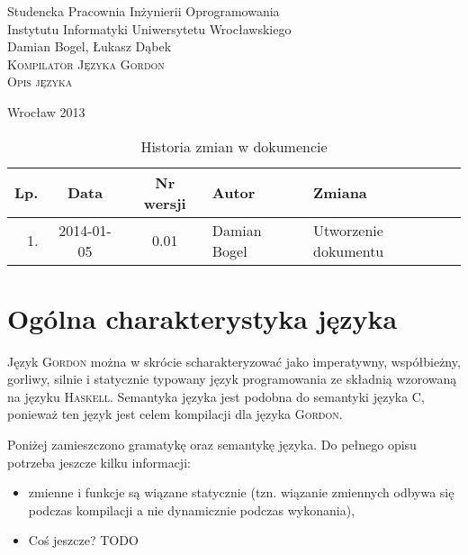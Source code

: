\documentclass{documentation}
\begin{document}
\begin{titlepage}
\begin{center}
Studencka Pracownia Inżynierii Oprogramowania\\
Instytutu Informatyki Uniwersytetu Wrocławskiego\\[6cm]

Damian Bogel, Łukasz Dąbek\\[1cm]
\textsc{\LARGE Kompilator Języka Gordon}\\[0.5cm]
\textsc{\large Opis języka}

\vfill
Wrocław 2013 \\[2.5cm]

\end{center}
\end{titlepage}

\newpage
\begin{table}
	\centering
    \captionsetup{name=Tabela}
	\caption{Historia zmian w dokumencie}
		\begin{tabular}{|r|c|c|l|l|}
		\hline
		Lp.  & Data       & Nr wersji & Autor                 & Zmiana \\ \hline
		1.   & 2014-01-05 & 0.01 & Damian Bogel & Utworzenie dokumentu \\ \hline
	\end{tabular}
\end{table}
\newpage

\tableofcontents
\setcounter{page}{2}

\newpage

\section{Ogólna charakterystyka języka}
Język \textsc{Gordon} można w skrócie scharakteryzować jako imperatywny, współbieżny,
gorliwy, silnie i statycznie typowany język programowania ze składnią wzorowaną
na języku \textsc{Haskell}. Semantyka języka jest podobna do semantyki języka
\textsc{C}, ponieważ ten język jest celem kompilacji dla języka \textsc{Gordon}.

Poniżej zamieszczono gramatykę oraz semantykę języka. Do pełnego opisu potrzeba
jeszcze kilku informacji:

\begin{itemize}
    \item zmienne i funkcje są wiązane statycznie (tzn. wiązanie zmiennych odbywa się
        podczas kompilacji a nie dynamicznie podczas wykonania),
    \item Coś jeszcze? TODO
\end{itemize}
\end{document}
